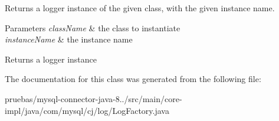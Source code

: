 Returns a logger instance of the given class, with the given instance name.


\begin{DoxyParams}{Parameters}
{\em class\+Name} & the class to instantiate \\
\hline
{\em instance\+Name} & the instance name \\
\hline
\end{DoxyParams}
\begin{DoxyReturn}{Returns}
a logger instance 
\end{DoxyReturn}


The documentation for this class was generated from the following file\+:\begin{DoxyCompactItemize}
\item 
pruebas/mysql-\/connector-\/java-\/8../src/main/core-\/impl/java/com/mysql/cj/log/Log\+Factory.\+java\end{DoxyCompactItemize}
